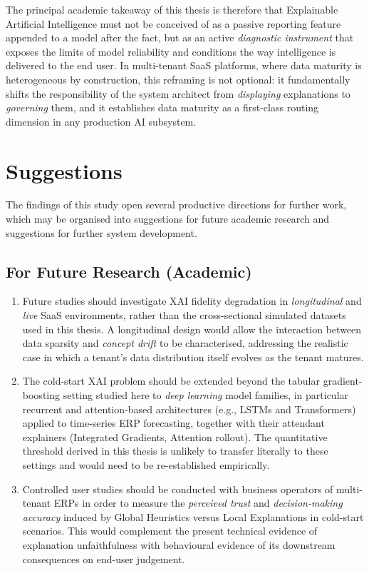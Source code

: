 The principal academic takeaway of this thesis is therefore that
Explainable Artificial Intelligence must not be conceived of as a passive
reporting feature appended to a model after the fact, but as an active
\emph{diagnostic instrument} that exposes the limits of model reliability
and conditions the way intelligence is delivered to the end user. In
multi-tenant SaaS platforms, where data maturity is heterogeneous by
construction, this reframing is not optional: it fundamentally shifts the
responsibility of the system architect from \emph{displaying} explanations
to \emph{governing} them, and it establishes data maturity as a
first-class routing dimension in any production AI subsystem.

\section{Suggestions}
\label{sec:suggestions}

The findings of this study open several productive directions for further
work, which may be organised into suggestions for future academic research
and suggestions for further system development.

\subsection{For Future Research (Academic)}
\label{subsec:future-research}

\begin{enumerate}
    \item Future studies should investigate XAI fidelity degradation in
    \emph{longitudinal} and \emph{live} SaaS environments, rather than the
    cross-sectional simulated datasets used in this thesis. A longitudinal
    design would allow the interaction between data sparsity and
    \emph{concept drift} to be characterised, addressing the realistic case
    in which a tenant's data distribution itself evolves as the tenant
    matures.
    \item The cold-start XAI problem should be extended beyond the tabular
    gradient-boosting setting studied here to \emph{deep learning} model
    families, in particular recurrent and attention-based architectures
    (e.g., LSTMs and Transformers) applied to time-series ERP forecasting,
    together with their attendant explainers (Integrated Gradients,
    Attention rollout). The quantitative threshold derived in this thesis
    is unlikely to transfer literally to these settings and would need to
    be re-established empirically.
    \item Controlled user studies should be conducted with business
    operators of multi-tenant ERPs in order to measure the \emph{perceived
    trust} and \emph{decision-making accuracy} induced by Global Heuristics
    versus Local Explanations in cold-start scenarios. This would
    complement the present technical evidence of explanation unfaithfulness
    with behavioural evidence of its downstream consequences on end-user
    judgement.
\end{enumerate}

